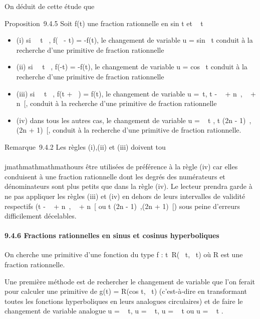 On déduit de cette étude que

Proposition~9.4.5 Soit f(t) une fraction rationnelle en
sin t et \cos~ t

\begin{itemize}
\itemsep1pt\parskip0pt
\item
  (i) si \forall~~t \in {}~, f(\pi~ - t) = -f(t), le
  changement de variable u = sin~ t conduit à
  la recherche d'une primitive de fraction rationnelle
\item
  (ii) si \forall~~t \in {}~, f(-t) = -f(t), le changement
  de variable u = cos~ t conduit à la recherche
  d'une primitive de fraction rationnelle
\item
  (iii) si \forall~~t \in {}~, f(t + \pi~) = f(t), le
  changement de variable u =\
  \mathrmtg t, t \in{]} - \pi~  + n\pi~, \pi~ \over 2 + n\pi~{[}, conduit à la recherche
  d'une primitive de fraction rationnelle
\item
  (iv) dans tous les autres cas, le changement de variable u
  = \mathrmtg~  t
   , t \in{]}(2n - 1)\pi~,(2n + 1)\pi~{[}, conduit à la
  recherche d'une primitive de fraction rationnelle.
\end{itemize}

Remarque~9.4.2 Les règles (i),(ii) et (iii) doivent tou\\\\jmathmathmathmathours être
utilisées de préférence à la règle (iv) car elles conduisent à une
fraction rationnelle dont les degrés des numérateurs et dénominateurs
sont plus petits que dans la règle (iv). Le lecteur prendra garde à ne
pas appliquer les règles (iii) et (iv) en dehors de leurs intervalles de
validité respectifs (t \in{]} - \pi~  + n\pi~, \pi~
\over 2 + n\pi~{[} ou t \in{]}(2n - 1)\pi~,(2n + 1)\pi~{[}) sous
peine d'erreurs difficilement décelables.

\paragraph{9.4.6 Fractions rationnelles en sinus et cosinus
hyperboliques}

On cherche une primitive d'une fonction du type f :
t\mapsto~R(\mathrmch~
t,\mathrmsh~ t) où R est une
fraction rationnelle.

Une première méthode est de rechercher le changement de variable que
l'on ferait pour calculer une primitive de g(t) =
R(cos t,\sin~ t)
(c'est-à-dire en transformant toutes les fonctions hyperboliques en
leurs analogues circulaires) et de faire le changement de variable
analogue u = \mathrmsh~ t, u
= \mathrmch~ t, u
= \mathrmth~ t ou u
= \mathrmth~  t
 .

